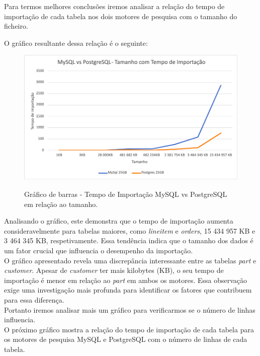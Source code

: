 \documentclass{article}
\begin{document}
\quad Para termos melhores conclusões iremos analisar a relação do tempo de importação de cada tabela nos dois motores de pesquisa com o tamanho do ficheiro.

\quad O gráfico resultante dessa relação é o seguinte:

\begin{figure}[H]
  \centering
  \includegraphics[width=\textwidth]{Graphs/SizevsImport.png}\\
  \caption{Gráfico de barras - Tempo de Importação MySQL vs PostgreSQL em relação ao tamanho.}
  \label{fig:row_import_time2}
\end{figure}


\quad Analisando o gráfico, este demonstra que o tempo de importação aumenta consideravelmente para tabelas maiores, como \textit{lineitem} e \textit{orders}, 15 434 957 KB e 3 464 345 KB, respetivamente. Essa tendência indica que o tamanho dos dados é um fator crucial que influencia o desempenho da importação.\\

\quad O gráfico apresentado revela uma discrepância interessante entre as tabelas \textit{part} e \textit{customer}. Apesar de \textit{customer} ter mais kilobytes (KB), o seu tempo de importação é menor em relação ao \textit{part} em ambos os motores. Essa observação exige uma investigação mais profunda para identificar os fatores que contribuem para essa diferença.\\

\quad Portanto iremos analisar mais um gráfico para verificarmos se o número de linhas influencia.\\

\quad O próximo gráfico mostra a relação do tempo de importação de cada tabela para os motores de pesquisa MySQL e PostgreSQL com o número de linhas de cada tabela.\\
\end{document}
